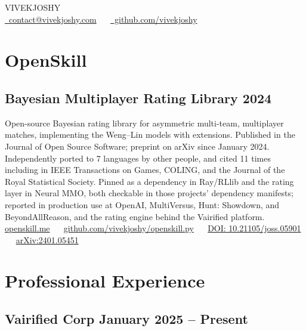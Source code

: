 \documentclass[11pt]{article}
\begin{document}
\begin{center}
    {\fontsize{28}{32}\selectfont\interthin VIVEK\interheavy JOSHY}\\[0.3cm]
    {\color{subheading}
    \href{mailto:contact@vivekjoshy.com}{\faEnvelope[regular]~contact@vivekjoshy.com} ~\textbullet~
    \href{https://www.github.com/vivekjoshy}{\faGithub~github.com/vivekjoshy}
    }
\end{center}

\section{OpenSkill}
\subsection{Bayesian Multiplayer Rating Library \hspace*{\fill} 2024}
Open-source Bayesian rating library for asymmetric multi-team, multiplayer matches,
implementing the Weng--Lin models with extensions. Published in the Journal of Open Source
Software; preprint on arXiv since January 2024. Independently ported to 7 languages by
other people, and cited 11 times including in IEEE Transactions on Games, COLING, and the
Journal of the Royal Statistical Society. Pinned as a dependency in Ray/RLlib and the rating
layer in Neural MMO, both checkable in those projects' dependency manifests; reported in
production use at OpenAI, MultiVersus, Hunt: Showdown, and BeyondAllReason, and the rating
engine behind the Vairified platform.\\
{\small\sloppy
\href{https://openskill.me}{openskill.me} ~\textbullet~
\href{https://github.com/vivekjoshy/openskill.py}{github.com/vivekjoshy/openskill.py} ~\textbullet~
\href{https://doi.org/10.21105/joss.05901}{DOI: 10.21105/joss.05901} ~\textbullet~
\href{https://arxiv.org/abs/2401.05451}{arXiv:2401.05451}
}

\section{Professional Experience}
\subsection{Vairified Corp \hspace*{\fill} January 2025 -- Present}
\end{document}
